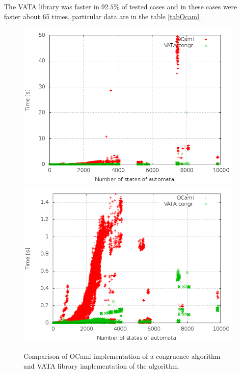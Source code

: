 The VATA library was faster in $92.5\%$ of tested cases and in these cases were faster about 65 times, particular data are in the table \ref{tabOcaml}.

\begin{figure}[bt]
\begin{center}
\includegraphics[scale=0.3]{fig/plot_hkc_zprava.png}
\includegraphics[scale=0.3]{fig/plot_hkc_step_zprava.png}
\caption{
Comparison of OCaml implementation of a congruence algorithm and VATA library implementation of the algorithm.}
\label{fig:figGraphOCaml}
\end{center}
\end{figure}

